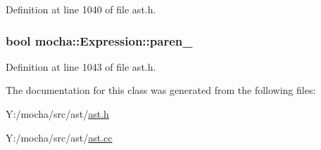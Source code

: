 Definition at line 1040 of file ast.h.

\hypertarget{classmocha_1_1_expression_af9e01128faf08a57ecc8db7e3fe5a4ea}{
\subsubsection[{paren\_\-}]{\setlength{\rightskip}{0pt plus 5cm}bool {\bf mocha::Expression::paren\_\-}}}
\label{classmocha_1_1_expression_af9e01128faf08a57ecc8db7e3fe5a4ea}


Definition at line 1043 of file ast.h.



The documentation for this class was generated from the following files:\begin{DoxyCompactItemize}
\item 
Y:/mocha/src/ast/\hyperlink{ast_8h}{ast.h}\item 
Y:/mocha/src/ast/\hyperlink{ast_8cc}{ast.cc}\end{DoxyCompactItemize}
